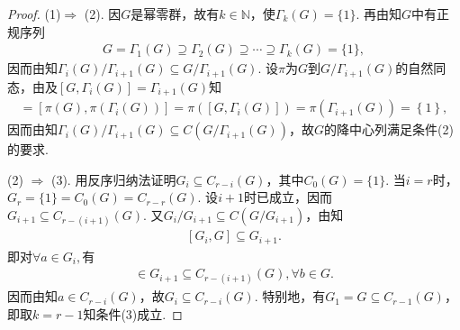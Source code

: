 \documentclass[../../main.tex]{subfiles}%
\begin{document}
\begin{proof}
(1)$\Rightarrow$ (2). 因$G$是幂零群，故有$k\in \mathbb{N}$，使$\Gamma_k(G) = \{1\}$.
再由知$G$中有正规序列
\begin{gather*}
G = \Gamma_1(G) \supseteq \Gamma_2(G) \supseteq \cdots \supseteq \Gamma_k(G) = \{1\},
\end{gather*}
因而由知$\Gamma_i(G)/\Gamma_{i+1}(G) \subseteq G/\Gamma_{i+1}(G)$. 设$\pi$为$G$到$G/\Gamma_{i+1}(G)$的自然同态，由及$[G, \Gamma_i(G)] = \Gamma_{i+1}(G)$知
\begin{align*}
[G/\Gamma _{i+1}(G),\Gamma _i(G)/\Gamma _{i+1}(G)]=[\pi (G),\pi (\Gamma _i(G))]=\pi \left( \left[ G,\Gamma _i(G) \right] \right) =\pi (\Gamma _{i+1}(G))=\left\{ 1 \right\},
\end{align*}
因而由知$\Gamma_i(G)/\Gamma_{i+1}(G) \subseteq C(G/\Gamma_{i+1}(G))$，故$G$的降中心列满足条件(2)的要求.

(2) $\Rightarrow$ (3). 用反序归纳法证明$G_i \subseteq C_{r - i}(G)$，其中$C_0(G) = \{1\}$. 当$i = r$时，$G_r = \{1\} = C_0(G) = C_{r - r}(G)$. 设$i + 1$时已成立，因而$G_{i+1} \subseteq C_{r - (i+1)}(G)$. 又$G_i/G_{i+1} \subseteq C(G/G_{i+1})$，由知
\begin{align*}
\left[ G_i,G \right] \subseteq G_{i+1}.
\end{align*}
即对$\forall a \in G_i,$有
\begin{align*}
[a,b]\in G_{i+1} \subseteq C_{r - (i+1)}(G),\forall b\in G.
\end{align*}
因而由知$a \in C_{r - i}(G)$，故$G_i \subseteq C_{r - i}(G)$. 特别地，有$G_1 = G \subseteq C_{r - 1}(G)$，即取$k = r - 1$知条件(3)成立.


\end{proof}
\end{document}
